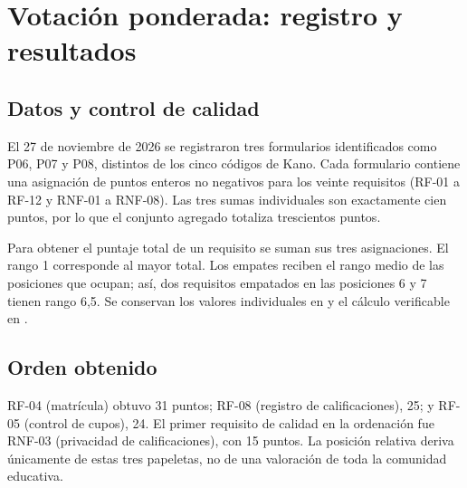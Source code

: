 \section{Votación ponderada: registro y resultados}
\label{sec:votacion}

\subsection{Datos y control de calidad}

El 27 de noviembre de 2026 se registraron tres formularios identificados como P06, P07 y P08, distintos de los cinco códigos de Kano. Cada formulario contiene una asignación de puntos enteros no negativos para los veinte requisitos (RF-01 a RF-12 y RNF-01 a RNF-08). Las tres sumas individuales son exactamente cien puntos, por lo que el conjunto agregado totaliza trescientos puntos.

Para obtener el puntaje total de un requisito se suman sus tres asignaciones. El rango 1 corresponde al mayor total. Los empates reciben el rango medio de las posiciones que ocupan; así, dos requisitos empatados en las posiciones 6 y 7 tienen rango 6,5. Se conservan los valores individuales en  y el cálculo verificable en .

\subsection{Orden obtenido}



RF-04 (matrícula) obtuvo 31 puntos; RF-08 (registro de calificaciones), 25; y RF-05 (control de cupos), 24. El primer requisito de calidad en la ordenación fue RNF-03 (privacidad de calificaciones), con 15 puntos. La posición relativa deriva únicamente de estas tres papeletas, no de una valoración de toda la comunidad educativa.
